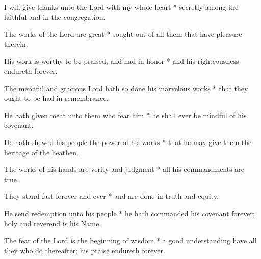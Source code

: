 I will give thanks unto the Lord with my whole heart * secretly among the faithful and in the congregation.

The works of the Lord are great * sought out of all them that have pleasure therein.
	
His work is worthy to be praised, and had in honor * and his righteousness endureth forever.
	
The merciful and gracious Lord hath so done his marvelous works * that they ought to be had in remembrance.
	
He hath given meat unto them who fear him * he shall ever be mindful of his covenant.
	
He hath shewed his people the power of his works * that he may give them the heritage of the heathen.
	
The works of his hands are verity and judgment * all his commandments are true.
	
They stand fast forever and ever * and are done in truth and equity.
	
He send redemption unto his people * he hath commanded his covenant forever; holy and reverend is his Name.
	
The fear of the Lord is the beginning of wisdom * a good understanding have all they who do thereafter; his praise endureth forever.